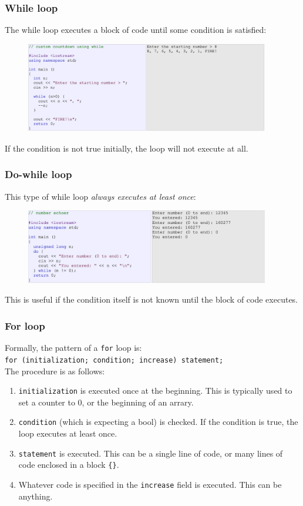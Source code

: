 \documentclass{if-beamer}
\begin{document}
\begin{frame}
\frametitle{While loop}
\vspace{2cm}
The while loop executes a block of code until some condition is satisfied:
\begin{figure}
\center
\includegraphics[width=0.95\textwidth]{figures/while.png}
\end{figure}
If the condition is not true initially, the loop will not execute at all.
\end{frame}

\begin{frame}
\frametitle{Do-while loop}
\vspace{2cm}
This type of while loop \textit{always executes at least once}:
\begin{figure}
\center
\includegraphics[width=0.95\textwidth]{figures/dowhile.png}
\end{figure}
This is useful if the condition itself is not known until the block of
code executes.
\end{frame}

\begin{frame}
\frametitle{For loop}
\vspace{1cm}
Formally, the pattern of a \texttt{for} loop is: \\
{\footnotesize \texttt{for (initialization; condition; increase) statement;}} \\
The procedure is as follows:
\begin{enumerate}
\item \texttt{initialization} is executed once at the beginning.
This is typically used to set a counter to 0, or the beginning
of an arrary.
\item \texttt{condition} (which is expecting a bool) is checked. If the condition is true, the loop executes at least once.
\item \texttt{statement} is executed. This can be a single line of
code, or many lines of code enclosed in a block \texttt{\{\}}.
\item Whatever code is specified in the \texttt{increase} field is executed. This can be anything.
\end{enumerate}
\end{frame}
\end{document}
